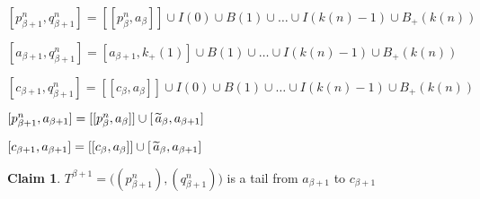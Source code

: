\documentclass[12pt]{article}
\theoremstyle{plain}
\theoremstyle{definition}
\newcounter{ClaimCounter}
\newtheorem{claim}[ClaimCounter]{Claim}
\newcounter{claim5counter}
\newcommand{\B}{\ensuremath{\beta}}
\newcommand{\0}{\ensuremath{\varnothing}}
\newcommand{\wt}{\ensuremath{\widetilde}}
\begin{document}
	\begin{center}
		$[p^n_{\B+1}, q^n_{\B+1}] = [[p^n_\B,a_\B]] \cup I(0) \cup B(1) \cup \ldots \cup I(k(n)-1) \cup B_{+}(k(n))$ 
		
		\vspace{3mm}
		
		$[a_{\B+1}, q^n_{\B+1}] = [a_{\B+1}, k_+(1)] \cup B(1) \cup \ldots \cup I(k(n)-1) \cup B_{+}(k(n))$ 
		
		\vspace{3mm}
		
		$[c_{\B+1}, q^n_{\B+1}] = [[c_\B,a_\B]] \cup I(0) \cup B(1) \cup \ldots \cup I(k(n)-1) \cup B_{+}(k(n))$
		
		\vspace{3mm}
		
		$[p^n_{\B+1}, a_{\B+1}] = [[p^n_{\B}, a_{\B} ]] \cup [\, \wt a_{\B}, a_{\B+1}]$
		
		\vspace{3mm}
		
		$[c_{\B+1}, a_{\B+1}] = [[c_{\B}, a_{\B} ]] \cup [ \, \wt a_{\B}, a_{\B+1}]$
		
	\end{center}
	
	\begin{claim}
		$T^{\B+1} = \big ((p^n_{\B+1}),(q^n_{\B+1}) \big)$ is a tail from $a_{\B+1}$ to $c_{\B+1}$
	\end{claim}
	
\end{document}
